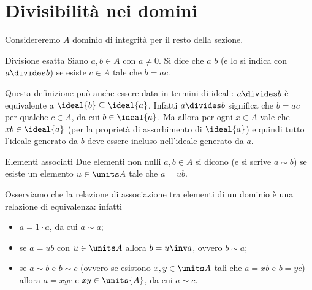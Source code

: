 \section{Divisibilità nei domini}

Considereremo $A$ dominio di integrità per il resto della sezione.

\begin{definition}
    {Divisione esatta}{}
    Siano $a, b \in A$ con $a \neq 0$. Si dice che $a$  $b$ (e lo si indica con $a \divides b$) se esiste $c \in A$ tale che $b = ac$.
\end{definition}

Questa definizione può anche essere data in termini di ideali: $a \divides b$ è equivalente a $\ideal{b} \subseteq \ideal{a}$. Infatti $a \divides b$ significa che $b = ac$ per qualche $c \in A$, da cui $b \in \ideal{a}$. Ma allora per ogni $x \in A$ vale che $xb \in \ideal{a}$ (per la proprietà di assorbimento di $\ideal{a}$) e quindi tutto l'ideale generato da $b$ deve essere incluso nell'ideale generato da $a$.

\begin{definition}
    {Elementi associati}{}
    Due elementi non nulli $a, b \in A$ si dicono  (e si scrive $a \sim b$) se esiste un elemento $u \in \units A$ tale che $a = ub$.
\end{definition}

Osserviamo che la relazione di associazione tra elementi di un dominio è una relazione di equivalenza: infatti 
\begin{itemize}
    \item $a = 1 \cdot a$, da cui $a \sim a$;
    \item se $a = ub$ con $u \in \units A$ allora $b = u\inv a$, ovvero $b \sim a$;
    \item se $a \sim b$ e $b \sim c$ (ovvero se esistono $x, y \in \units A$ tali che $a = xb$ e $b = yc$) allora $a = xyc$ e $xy \in \units{A}$, da cui $a \sim c$.
\end{itemize}

